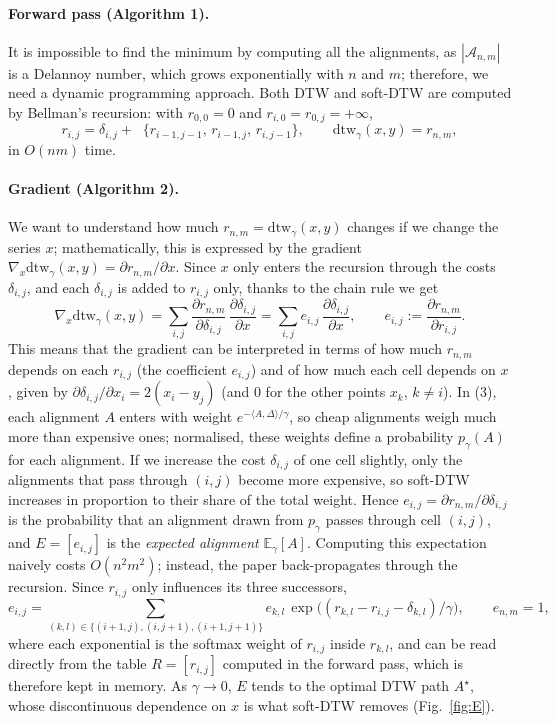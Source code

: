 \documentclass[11pt]{article}
\newcommand{\sdtw}{\mathrm{dtw}_\gamma}
\newcommand{\minop}{\mathop{\mathrm{min}^\gamma}}
\begin{document}
\paragraph{Forward pass (Algorithm 1).}
It is impossible to find the minimum by computing all the alignments, as $|\mathcal A_{n,m}|$ is a Delannoy number, which grows exponentially with $n$ and $m$; therefore, we need a dynamic programming approach. Both DTW and soft-DTW are computed by Bellman's recursion: with $r_{0,0}=0$ and $r_{i,0}=r_{0,j}=+\infty$,
\begin{equation}
r_{i,j}=\delta_{i,j}+\minop\{r_{i-1,j-1},\,r_{i-1,j},\,r_{i,j-1}\},\qquad \sdtw(x,y)=r_{n,m},
\end{equation}
in $O(nm)$ time.

\paragraph{Gradient (Algorithm 2).}
We want to understand how much $r_{n,m}=\sdtw(x,y)$ changes if we change the series $x$; mathematically, this is expressed by the gradient $\nabla_x\sdtw(x,y)=\partial r_{n,m}/\partial x$. Since $x$ only enters the recursion through the costs $\delta_{i,j}$, and each $\delta_{i,j}$ is added to $r_{i,j}$ only, thanks to the chain rule we get
\begin{equation}
\nabla_x\sdtw(x,y)=\sum_{i,j}\frac{\partial r_{n,m}}{\partial \delta_{i,j}}\,\frac{\partial \delta_{i,j}}{\partial x}=\sum_{i,j}e_{i,j}\,\frac{\partial \delta_{i,j}}{\partial x},\qquad e_{i,j}:=\frac{\partial r_{n,m}}{\partial r_{i,j}} .
\end{equation}
This means that the gradient can be interpreted in terms of how much $r_{n,m}$ depends on each $r_{i,j}$ (the coefficient $e_{i,j}$) and of how much each cell depends on $x$, given by $\partial\delta_{i,j}/\partial x_i=2(x_i-y_j)$ (and $0$ for the other points $x_k$, $k\neq i$). In (3), each alignment $A$ enters with weight $e^{-\langle A,\Delta\rangle/\gamma}$, so cheap alignments weigh much more than expensive ones; normalised, these weights define a probability $p_\gamma(A)$ for each alignment. If we increase the cost $\delta_{i,j}$ of one cell slightly, only the alignments that pass through $(i,j)$ become more expensive, so soft-DTW increases in proportion to their share of the total weight. Hence $e_{i,j}=\partial r_{n,m}/\partial\delta_{i,j}$ is the probability that an alignment drawn from $p_\gamma$ passes through cell $(i,j)$, and $E=[e_{i,j}]$ is the \emph{expected alignment} $\mathbb E_\gamma[A]$. Computing this expectation naively costs $O(n^2m^2)$; instead, the paper back-propagates through the recursion. Since $r_{i,j}$ only influences its three successors,
\begin{equation}
e_{i,j}=\sum_{(k,l)\in\{(i+1,j),(i,j+1),(i+1,j+1)\}} e_{k,l}\,\exp\!\big((r_{k,l}-r_{i,j}-\delta_{k,l})/\gamma\big),\qquad e_{n,m}=1,
\end{equation}
where each exponential is the softmax weight of $r_{i,j}$ inside $r_{k,l}$, and can be read directly from the table $R=[r_{i,j}]$ computed in the forward pass, which is therefore kept in memory. As $\gamma\to0$, $E$ tends to the optimal DTW path $A^\star$, whose discontinuous dependence on $x$ is what soft-DTW removes (Fig.~\ref{fig:E}).
\end{document}
